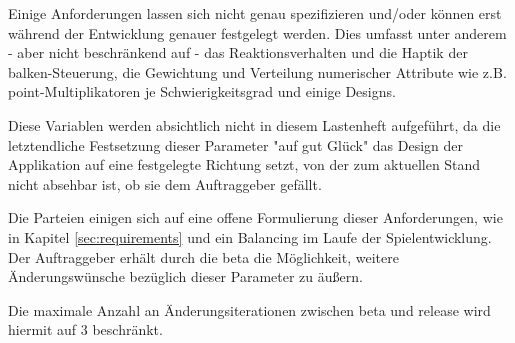 Einige Anforderungen lassen sich nicht genau spezifizieren und/oder können erst während der Entwicklung genauer festgelegt werden.
Dies umfasst unter anderem - aber nicht beschränkend auf - das Reaktionsverhalten und die Haptik der \gls{balken}-Steuerung,
die Gewichtung und Verteilung numerischer Attribute wie z.B. \gls{point}-Multiplikatoren je Schwierigkeitsgrad und einige Designs.

\vspace{1em}

Diese Variablen werden absichtlich nicht in diesem Lastenheft aufgeführt, da die letztendliche Festsetzung dieser Parameter
"auf gut Glück" das Design der Applikation auf eine festgelegte Richtung setzt, von der zum aktuellen Stand nicht
absehbar ist, ob sie dem Auftraggeber gefällt.

\vspace{1em}

Die Parteien einigen sich auf eine offene Formulierung dieser Anforderungen, wie in Kapitel \ref{sec:requirements} und
ein Balancing im Laufe der Spielentwicklung. Der Auftraggeber erhält durch die \gls{beta} die Möglichkeit, weitere Änderungswünsche
bezüglich dieser Parameter zu äußern.

Die maximale Anzahl an Änderungsiterationen zwischen \gls{beta} und \gls{release} wird hiermit auf 3 beschränkt.

